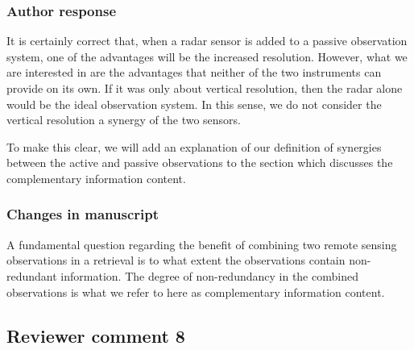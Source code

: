 \subsubsection*{Author response}

It is certainly correct that, when a radar sensor is added to a passive
observation system, one of the advantages will be the increased resolution.
However, what we are interested in are the advantages that neither of the two
instruments can provide on its own. If it was only about vertical resolution,
then the radar alone would be the ideal observation system. In this sense, we do
not consider the vertical resolution a synergy of the two sensors.

To make this clear, we will add an explanation of our definition of synergies
between the active and passive observations to the section which discusses the
complementary information content.

\subsubsection*{Changes in manuscript}
\begin{change}[262]
A fundamental question regarding the benefit of combining two remote sensing
observations in a retrieval is to what extent the observations contain
non-redundant information. The degree of non-redundancy in the combined
observations is what we refer to here as complementary information content. \DIFaddbegin {}
\end{change}



\subsection*{Reviewer comment 8}

